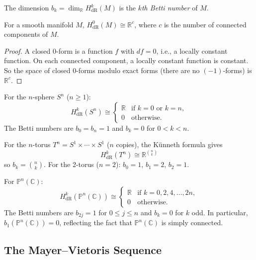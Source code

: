 The dimension $b_k = \dim_{\mathbb{R}} H^k_{\text{dR}}(M)$ is the \emph{$k$th Betti number} of $M$.

\begin{proposition}
For a smooth manifold $M$, $H^0_{\text{dR}}(M) \cong \mathbb{R}^c$, where $c$ is the number of connected components of $M$.
\end{proposition}

\begin{proof}
A closed $0$-form is a function $f$ with $df = 0$, i.e., a locally constant function. On each connected component, a locally constant function is constant. So the space of closed $0$-forms modulo exact forms (there are no $(-1)$-forms) is $\mathbb{R}^c$.
\end{proof}

\begin{example}
For the $n$-sphere $S^n$ ($n \ge 1$):
\[
H^k_{\text{dR}}(S^n) \cong \begin{cases} \mathbb{R} & \text{if } k = 0 \text{ or } k = n, \\ 0 & \text{otherwise.} \end{cases}
\]
The Betti numbers are $b_0 = b_n = 1$ and $b_k = 0$ for $0 < k < n$.
\end{example}

\begin{example}
For the $n$-torus $T^n = S^1 \times \cdots \times S^1$ ($n$ copies), the Künneth formula gives
\[
H^k_{\text{dR}}(T^n) \cong \mathbb{R}^{\binom{n}{k}}
\]
so $b_k = \binom{n}{k}$. For the 2-torus ($n = 2$): $b_0 = 1$, $b_1 = 2$, $b_2 = 1$.
\end{example}

\begin{example}
For $\mathbb{P}^n(\mathbb{C})$:
\[
H^k_{\text{dR}}(\mathbb{P}^n(\mathbb{C})) \cong \begin{cases} \mathbb{R} & \text{if } k = 0, 2, 4, \ldots, 2n, \\ 0 & \text{otherwise.} \end{cases}
\]
The Betti numbers are $b_{2j} = 1$ for $0 \le j \le n$ and $b_k = 0$ for $k$ odd. In particular, $b_1(\mathbb{P}^n(\mathbb{C})) = 0$, reflecting the fact that $\mathbb{P}^n(\mathbb{C})$ is simply connected.
\end{example}

\subsection{The Mayer--Vietoris Sequence}

